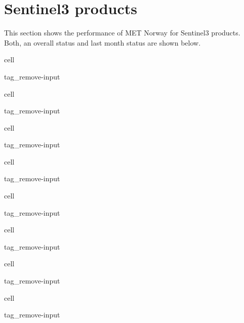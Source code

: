 \documentclass[letterpaper,10pt,english]{jupyterBook}
\begin{document}
\chapter{Sentinel\sphinxhyphen{}3 products}
\label{\detokenize{S3_portals:sentinel-3-products}}\label{\detokenize{S3_portals::doc}}
\sphinxAtStartPar
This section shows the performance of MET Norway for Sentinel\sphinxhyphen{}3 products. Both, an overall status and last month status are shown below.

\begin{sphinxuseclass}{cell}
\begin{sphinxuseclass}{tag_remove-input}
\end{sphinxuseclass}
\end{sphinxuseclass}
\begin{sphinxuseclass}{cell}
\begin{sphinxuseclass}{tag_remove-input}
\end{sphinxuseclass}
\end{sphinxuseclass}
\begin{sphinxuseclass}{cell}
\begin{sphinxuseclass}{tag_remove-input}
\end{sphinxuseclass}
\end{sphinxuseclass}
\begin{sphinxuseclass}{cell}
\begin{sphinxuseclass}{tag_remove-input}
\end{sphinxuseclass}
\end{sphinxuseclass}
\begin{sphinxuseclass}{cell}
\begin{sphinxuseclass}{tag_remove-input}
\end{sphinxuseclass}
\end{sphinxuseclass}
\begin{sphinxuseclass}{cell}
\begin{sphinxuseclass}{tag_remove-input}
\end{sphinxuseclass}
\end{sphinxuseclass}
\begin{sphinxuseclass}{cell}
\begin{sphinxuseclass}{tag_remove-input}
\end{sphinxuseclass}
\end{sphinxuseclass}
\begin{sphinxuseclass}{cell}
\begin{sphinxuseclass}{tag_remove-input}
\end{sphinxuseclass}
\end{sphinxuseclass}
\end{document}
